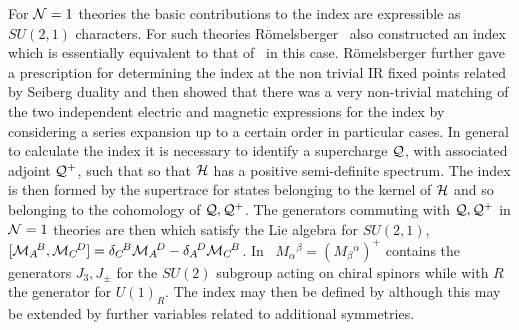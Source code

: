 For ${\cal N}=1$ theories the basic contributions to the index are expressible as
$SU(2,1)$ characters. For such theories  R\"omelsberger \ also 
constructed an index which is essentially equivalent to that of \mald\ in this case.
R\"omelsberger further gave a prescription for determining the index at the
non trivial IR fixed points related by Seiberg duality and then showed
that there was a very non-trivial matching of the two independent
electric and magnetic expressions for the index by considering a series
expansion up to a certain order in particular cases. In general to calculate the 
index it is necessary to identify a supercharge ${\cal Q}$, with associated 
adjoint ${\cal Q}^+$, 
such that
\eqn{}
so that ${\cal H}$ has a positive semi-definite spectrum. The index is then formed by
the supertrace for states belonging to the kernel of ${\cal H}$
and so belonging to the cohomology of  ${\cal Q},{\cal Q}^+$. The generators commuting with 
${\cal Q},{\cal Q}^+$ in ${\cal N}=1$ theories are then
\eqn{}
which satisfy the Lie algebra for $SU(2,1)$, $[ {\cal M}_A{}^{\! B}, {\cal M}_C{}^{\! D} ] = 
\delta_C{}^{\! B} {\cal M}_A{}^{\! D} - \delta_A{}^{\! D} {\cal M}_C{}^{\! B}$. In \suto\ 
$M_\alpha{}^{\! \beta} = ( M_\beta{}^{\alpha})^+$ contains the generators
$J_3,J_\pm$ for the $SU(2)$ subgroup acting on chiral spinors while
\eqn{}
with $R$ the generator for $U(1)_R$. The index may then be defined by
\eqn\indt{
I(t,x) = \tr_{{\rm ker} \H} \big ( (-1)^F t^\R x^{2J_3} \big ) \, ,
}
although this may be extended by further variables related to additional
symmetries.

